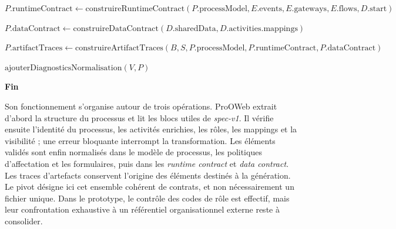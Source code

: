 \begin{algorithm}[H]
$P.\mathrm{runtimeContract} \leftarrow
\mathrm{construireRuntimeContract}(P.\mathrm{processModel},
E.\mathrm{events},E.\mathrm{gateways},E.\mathrm{flows},D.\mathrm{start})$\;

$P.\mathrm{dataContract} \leftarrow
\mathrm{construireDataContract}(D.\mathrm{sharedData},
D.\mathrm{activities}.\mathrm{mappings})$\;

$P.\mathrm{artifactTraces} \leftarrow
\mathrm{construireArtifactTraces}(B,S,
P.\mathrm{processModel},P.\mathrm{runtimeContract},P.\mathrm{dataContract})$\;

$\mathrm{ajouterDiagnosticsNormalisation}(V,P)$\;

\;

\textbf{Fin}
\end{algorithm}

Son fonctionnement s'organise autour de trois opérations. ProOWeb extrait
d'abord la structure du processus et lit les blocs utiles de \textit{spec-v1}.
Il vérifie ensuite l'identité du processus, les activités enrichies, les rôles,
les mappings et la visibilité ; une erreur bloquante interrompt la
transformation. Les éléments validés sont enfin normalisés dans le modèle de
processus, les politiques d'affectation et les formulaires, puis dans les
\textit{runtime contract} et \textit{data contract}. Les traces d'artefacts conservent l'origine des
éléments destinés à la génération. Le pivot désigne ici cet ensemble cohérent
de contrats, et non nécessairement un fichier unique. Dans le prototype, le
contrôle des codes de rôle est effectif, mais leur confrontation exhaustive à
un référentiel organisationnel externe reste à consolider.



